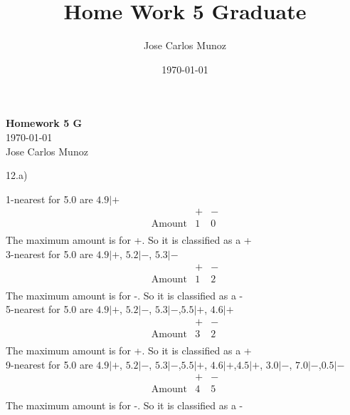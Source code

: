 \documentclass[12pt,english]{article}
\title{Home Work 5 Graduate}
\date{\today}
\author{Jose Carlos Munoz}
\begin{document}
\begin{center}
    \Large
    \textbf{Homework 5 G}\\
    \small
    \today\\
    \large
    Jose Carlos Munoz
\end{center}%
\par
12.a)\\
\par
1-nearest for 5.0 are $4.9 | +$
\begin{equation*}
\begin{array}{c|cc}
              & + & - \\
\hline          
\mbox{Amount} & 1 & 0 \\
\end{array}
\end{equation*}
The maximum amount is for +. So it is classified as a +\\
3-nearest for 5.0 are $4.9 | +$, $5.2 | -$, $5.3 | -$
\begin{equation*}
\begin{array}{c|cc}
              & + & - \\
\hline          
\mbox{Amount} & 1 & 2 \\
\end{array}
\end{equation*}
The maximum amount is for -. So it is classified as a -\\
5-nearest for 5.0 are $4.9 | +$, $5.2 | -$, $5.3 | -$,$5.5 | +$, $4.6 | +$
\begin{equation*}
\begin{array}{c|cc}
              & + & - \\
\hline          
\mbox{Amount} & 3 & 2 \\
\end{array}
\end{equation*}
The maximum amount is for +. So it is classified as a +\\
9-nearest for 5.0 are $4.9 | +$, $5.2 | -$, $5.3 | -$,$5.5 | +$, $4.6 | +$,$4.5 | +$, $3.0 | -$, $7.0 | -$,$0.5 | -$
\begin{equation*}
\begin{array}{c|cc}
              & + & - \\
\hline          
\mbox{Amount} & 4 & 5 \\
\end{array}
\end{equation*}
The maximum amount is for -. So it is classified as a -\\
\end{document}

